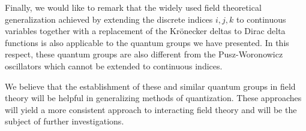 Finally, we would like to remark that the widely used field
theoretical generalization achieved by extending the discrete
indices $i, j, k$ to continuous variables together with a
replacement of the Kr\"onecker deltas to Dirac delta functions is
also applicable to the quantum groups we have presented. In this
respect, these quantum groups are also different from the
Pusz-Woronowicz oscillators which cannot be extended to continuous
indices.

We believe that the establishment of these and similar quantum
groups in field theory will be helpful in generalizing methods of
quantization. These approaches will yield a more consistent
approach to interacting field theory and will be the subject of
further investigations.
